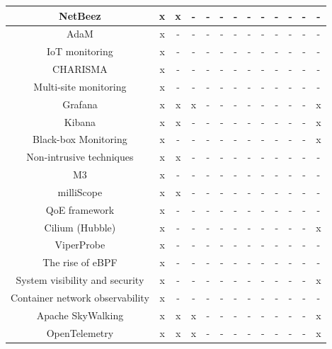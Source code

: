 \begin{longtable}{|c|c|c|c|c|c|c|c|c|c|c|c|c|}
NetBeez                         & x  & x  & -  & -  & -  & -  & -  & -  & -  & -  & -  & -  \\ \hline
AdaM                            & x  & -  & -  & -  & -  & -  & -  & -  & -  & -  & -  & -  \\ \hline
IoT monitoring                  & x  & -  & -  & -  & -  & -  & -  & -  & -  & -  & -  & -  \\ \hline
CHARISMA                        & x  & -  & -  & -  & -  & -  & -  & -  & -  & -  & -  & -  \\ \hline
Multi-site monitoring           & x  & -  & -  & -  & -  & -  & -  & -  & -  & -  & -  & -  \\ \hline
Grafana                         & x  & x  & x  & -  & -  & -  & -  & -  & -  & -  & -  & x  \\ \hline
Kibana                          & x  & x  & -  & -  & -  & -  & -  & -  & -  & -  & -  & x  \\ \hline
Black-box Monitoring            & x  & -  & -  & -  & -  & -  & -  & -  & -  & -  & -  & x  \\ \hline
Non-intrusive techniques        & x  & x  & -  & -  & -  & -  & -  & -  & -  & -  & -  & -  \\ \hline
M3                              & x  & -  & -  & -  & -  & -  & -  & -  & -  & -  & -  & -  \\ \hline
milliScope                      & x  & x  & -  & -  & -  & -  & -  & -  & -  & -  & -  & -  \\ \hline
QoE framework                   & x  & -  & -  & -  & -  & -  & -  & -  & -  & -  & -  & -  \\ \hline
Cilium (Hubble)                 & x  & -  & -  & -  & -  & -  & -  & -  & -  & -  & -  & x  \\ \hline
ViperProbe                      & x  & -  & -  & -  & -  & -  & -  & -  & -  & -  & -  & -  \\ \hline
The rise of eBPF                & x  & -  & -  & -  & -  & -  & -  & -  & -  & -  & -  & -  \\ \hline
System visibility and security  & x  & -  & -  & -  & -  & -  & -  & -  & -  & -  & -  & x  \\ \hline
Container network observability & x  & -  & -  & -  & -  & -  & -  & -  & -  & -  & -  & -  \\ \hline
Apache SkyWalking               & x  & x  & x  & -  & -  & -  & -  & -  & -  & -  & -  & x  \\ \hline
OpenTelemetry                   & x  & x  & x  & -  & -  & -  & -  & -  & -  & -  & -  & x  \\ \hline

\end{longtable}
